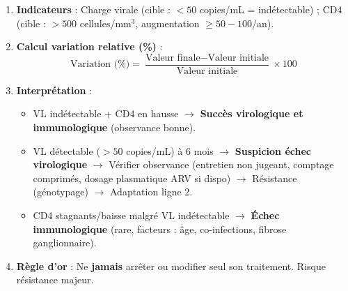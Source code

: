 \documentclass[11pt]{article}
\begin{document}
\begin{methode}
\begin{enumerate}
\item \textbf{Indicateurs} : Charge virale (cible : $< 50$ copies/mL = indétectable) ; CD4 (cible : $> 500$ cellules/mm$^3$, augmentation $\ge 50-100$/an).
\item \textbf{Calcul variation relative (\%)} :
\[
\text{Variation (\%)} = \frac{\text{Valeur finale} - \text{Valeur initiale}}{\text{Valeur initiale}} \times 100
\]
\item \textbf{Interprétation} :
\begin{itemize}
\item VL indétectable + CD4 en hausse $\rightarrow$ \textbf{Succès virologique et immunologique} (observance bonne).
\item VL détectable ($> 50$ copies/mL) à 6 mois $\rightarrow$ \textbf{Suspicion échec virologique} $\rightarrow$ Vérifier observance (entretien non jugeant, comptage comprimés, dosage plasmatique ARV si dispo) $\rightarrow$ Résistance (génotypage) $\rightarrow$ Adaptation ligne 2.
\item CD4 stagnants/baisse malgré VL indétectable $\rightarrow$ \textbf{Échec immunologique} (rare, facteurs : âge, co-infections, fibrose ganglionnaire).
\end{itemize}
\item \textbf{Règle d'or} : Ne \textbf{jamais} arrêter ou modifier seul son traitement. Risque résistance majeur.
\end{enumerate}
\end{methode}
\end{document}
